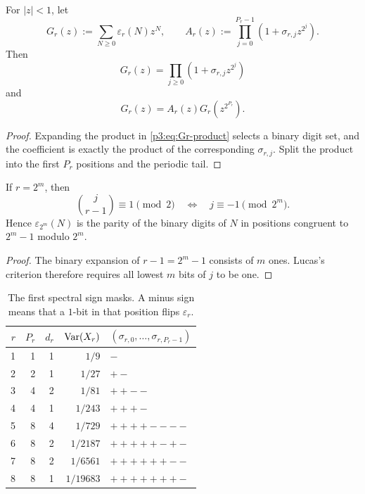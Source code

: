 \documentclass[11pt,oneside]{article}
\theoremstyle{definition}
\theoremstyle{remark}
\begin{document}
\begin{corollary}\label{p3:cor:mahler-r}
For $|z|<1$, let
\begin{equation}\label{p3:eq:Gr}
 G_r(z):=\sum_{N\ge0}\varepsilon_r(N)z^N,
 \qquad
 A_r(z):=\prod_{j=0}^{P_r-1}(1+\sigma_{r,j}z^{2^j}).
\end{equation}
Then
\begin{equation}\label{p3:eq:Gr-product}
 G_r(z)=\prod_{j\ge0}(1+\sigma_{r,j}z^{2^j})
\end{equation}
and
\begin{equation}\label{p3:eq:mahler-r}
  G_r(z)=A_r(z)G_r\!\left(z^{2^{P_r}}\right).
\end{equation}
\end{corollary}

\begin{proof}
Expanding the product in \eqref{p3:eq:Gr-product} selects a binary digit set, and the coefficient is exactly the product of the corresponding $\sigma_{r,j}$.  Split the product into the first $P_r$ positions and the periodic tail.
\end{proof}

\begin{corollary}\label{p3:cor:power-two-rank}
If $r=2^m$, then
\begin{equation}\label{p3:eq:power-two-position}
 \binom j{r-1}\equiv1\pmod2
 \quad\Longleftrightarrow\quad
 j\equiv-1\pmod{2^m}.
\end{equation}
Hence $\varepsilon_{2^m}(N)$ is the parity of the binary digits of $N$ in positions congruent to $2^m-1$ modulo $2^m$.
\end{corollary}

\begin{proof}
The binary expansion of $r-1=2^m-1$ consists of $m$ ones.  Lucas's criterion therefore requires all lowest $m$ bits of $j$ to be one.
\end{proof}

\begin{table}[ht]
\centering
\caption{The first spectral sign masks.  A minus sign means that a $1$-bit in that position flips $\varepsilon_r$.}
\label{p3:tab:sign-masks}
\begin{tabular}{@{}rrrrl@{}}
\toprule
$r$ & $P_r$ & $d_r$ & $\operatorname{Var}(X_r)$ & $(\sigma_{r,0},\ldots,\sigma_{r,P_r-1})$\\
\midrule
1 & 1 & 1 & $1/9$     & $-$\\
2 & 2 & 1 & $1/27$    & $+-$\\
3 & 4 & 2 & $1/81$    & $++--$\\
4 & 4 & 1 & $1/243$   & $+++- $\\
5 & 8 & 4 & $1/729$   & $++++----$\\
6 & 8 & 2 & $1/2187$  & $+++++-+-$\\
7 & 8 & 2 & $1/6561$  & $++++++--$\\
8 & 8 & 1 & $1/19683$ & $+++++++- $\\
\bottomrule
\end{tabular}
\end{table}
\end{document}
